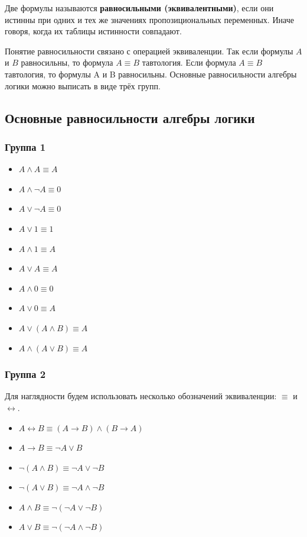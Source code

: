 \documentclass[12pt,letterpaper]{article}
\begin{document}
Две формулы называются \textbf{равносильными (эквивалентными)}, если они истинны при одних и тех же значениях пропозициональных переменных. Иначе говоря, когда их таблицы истинности совпадают.

Понятие равносильности связано с операцией эквиваленции. Так если формулы \(A\) и \(B\) равносильны, то формула \(A \equiv B\) тавтология. Если формула \(A \equiv B\) тавтология, то формулы A и B равносильны. Основные равносильности алгебры логики можно выписать в виде трёх групп.

\subsection{Основные равносильности алгебры логики}

\subsubsection{Группа 1}

\begin{itemize}
  \item \(A \wedge A \equiv A\)
  \item \(A \wedge \neg A \equiv 0\)
  \item \(A \vee \neg A \equiv 0\)
  \item \(A \vee 1 \equiv 1\)
  \item \(A \wedge 1 \equiv A\)
  \item \(A \vee A \equiv A\)
  \item \(A \wedge 0 \equiv 0\)
  \item \(A \vee 0 \equiv A\)
  \item \(A \vee (A \wedge B) \equiv A\)
  \item \(A \wedge (A \vee B) \equiv A\)
\end{itemize}

\subsubsection{Группа 2}

Для наглядности будем использовать несколько обозначений эквиваленции: \(\equiv\) и \(\leftrightarrow\).

\begin{itemize}
  \item \(A \leftrightarrow B \equiv (A \rightarrow B) \wedge (B \rightarrow A)\)
  \item \(A \rightarrow B \equiv \neg A \vee B\)
  \item \(\neg (A \wedge B) \equiv \neg A \vee \neg B\)
  \item \(\neg (A \vee B) \equiv \neg A \wedge \neg B\)
  \item \(A \wedge B \equiv \neg (\neg A \vee \neg B)\)
  \item \(A \vee B \equiv \neg (\neg A \wedge \neg B)\)
\end{itemize}
\end{document}
